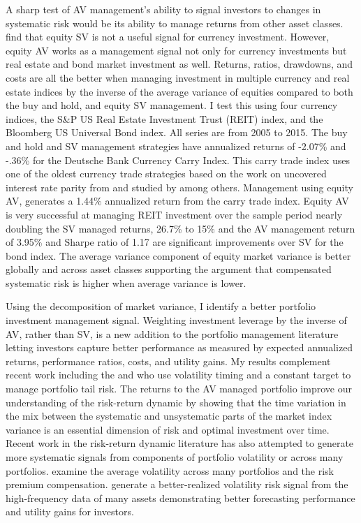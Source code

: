 A sharp test of AV management's ability to signal investors to changes in systematic risk would be its ability to manage returns from other asset classes. \citet{moreira_volatility-managed_2017} find that equity SV is not a useful signal for currency investment. However, equity AV works as a management signal not only for currency investments but real estate and bond market investment as well. Returns, ratios, drawdowns, and costs are all the better when managing investment in multiple currency and real estate indices by the inverse of the average variance of equities compared to both the buy and hold, and equity SV management. I test this using four currency indices, the S\&P US Real Estate Investment Trust (REIT) index, and the Bloomberg US Universal Bond index. All series are from 2005 to 2015. The buy and hold and SV management strategies have annualized returns of -2.07\% and -.36\% for the Deutsche Bank Currency Carry Index. This carry trade index uses one of the oldest currency trade strategies based on the work on uncovered interest rate parity from \citet{noauthor_speculative_nodate,fama_forward_1984} and studied by \citet{lustig_cross_2007,brunnermeier_carry_nodate,burnside_carry_2011} among others. Management using equity AV, generates a 1.44\% annualized return from the carry trade index. Equity AV is very successful at managing REIT investment over the sample period nearly doubling the SV managed returns, 26.7\% to 15\% and the AV management return of 3.95\% and Sharpe ratio of 1.17 are significant improvements over SV for the bond index. The average variance component of equity market variance is better globally and across asset classes supporting the argument that compensated systematic risk is higher when average variance is lower. 

Using the decomposition of market variance, I identify a better portfolio investment management signal. Weighting investment leverage by the inverse of AV, rather than SV, is a new addition to the portfolio management literature letting investors capture better performance as measured by expected annualized returns,  performance ratios, costs, and utility gains. My results complement recent work including the \citet{moreira_volatility-managed_2017} and \citet{hocquard_constant-volatility_2013} who use volatility timing and a constant target to manage portfolio tail risk. The returns to the AV managed portfolio improve our understanding of the risk-return dynamic by showing that the time variation in the mix between the systematic and unsystematic parts of the market index variance is an essential dimension of risk and optimal investment over time.  Recent work in the risk-return dynamic literature has also attempted to generate more systematic signals from components of portfolio volatility or across many portfolios. \citet{gonzalez-urteaga_cross-sectional_2016} examine the average volatility across many portfolios and the risk premium compensation. \citet{bollerslev_risk_2017} generate a better-realized volatility risk signal from the high-frequency data of many assets demonstrating better forecasting performance and utility gains for investors. 

